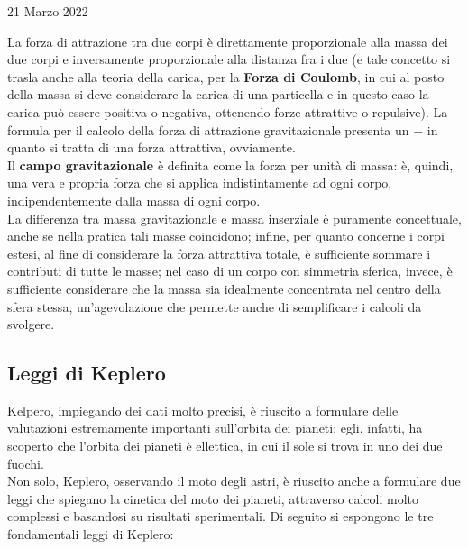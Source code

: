 \documentclass[a4paper]{extarticle}
\begin{document}
\newpage
\noindent
\begin{center}
  21 Marzo 2022
\end{center}
La forza di attrazione tra due corpi è direttamente proporzionale alla massa dei due corpi e inversamente proporzionale alla distanza fra i due (e tale concetto si trasla anche alla teoria della carica, per la \textbf{Forza di Coulomb}, in cui al posto della massa si deve considerare la carica di una particella e in questo caso la carica può essere positiva o negativa, ottenendo forze attrattive o repulsive). La formula per il calcolo della forza di attrazione gravitazionale presenta un $-$ in quanto si tratta di una forza attrattiva, ovviamente.\\
Il \textbf{campo gravitazionale} è definita come la forza per unità di massa: è, quindi, una vera e propria forza che si applica indistintamente ad ogni corpo, indipendentemente dalla massa di ogni corpo.\\
La differenza tra massa gravitazionale e massa inserziale è puramente concettuale, anche se nella pratica tali masse coincidono; infine, per quanto concerne i corpi estesi, al fine di considerare la forza attrattiva totale, è sufficiente sommare i contributi di tutte le masse; nel caso di un corpo con simmetria sferica, invece, è sufficiente considerare che la massa sia idealmente concentrata nel centro della sfera stessa, un'agevolazione che permette anche di semplificare i calcoli da svolgere.

\vspace{1em}
\subsection{Leggi di Keplero}
Kelpero, impiegando dei dati molto precisi, è riuscito a formulare delle valutazioni estremamente importanti sull'orbita dei pianeti: egli, infatti, ha scoperto che l'orbita dei pianeti è ellettica, in cui il sole si trova in uno dei due fuochi.\\
Non solo, Keplero, osservando il moto degli astri, è riuscito anche a formulare due leggi che spiegano la cinetica del moto dei pianeti, attraverso calcoli molto complessi e basandosi su risultati sperimentali. Di seguito si espongono le tre fondamentali leggi di Keplero:
\end{document}
